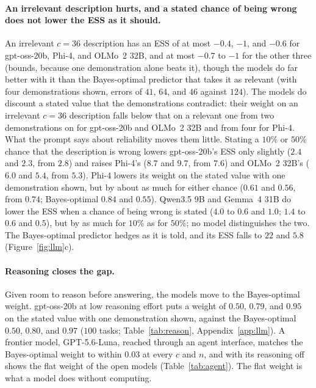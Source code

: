 \documentclass{article}
\begin{document}
\paragraph{An irrelevant description hurts, and a stated chance of being wrong does not lower the ESS as it should.} An irrelevant $c = 36$ description has an ESS of at most $-0.4$, $-1$, and $-0.6$ for gpt-oss-20b, Phi-4, and OLMo~2 32B, and at most $-0.7$ to $-1$ for the other three (bounds, because one demonstration alone beats it), though the models do far better with it than the Bayes-optimal predictor that takes it as relevant (with four demonstrations shown, errors of $41$, $64$, and $46$ against $124$). The models do discount a stated value that the demonstrations contradict: their weight on an irrelevant $c = 36$ description falls below that on a relevant one from two demonstrations on for gpt-oss-20b and OLMo~2 32B and from four for Phi-4. What the prompt says about reliability moves them little. Stating a $10\%$ or $50\%$ chance that the description is wrong lowers gpt-oss-20b's ESS only slightly ($2.4$ and $2.3$, from $2.8$) and raises Phi-4's ($8.7$ and $9.7$, from $7.6$) and OLMo~2 32B's ($6.0$ and $5.4$, from $5.3$). Phi-4 lowers its weight on the stated value with one demonstration shown, but by about as much for either chance ($0.61$ and $0.56$, from $0.74$; Bayes-optimal $0.84$ and $0.55$). Qwen3.5 9B and Gemma~4 31B do lower the ESS when a chance of being wrong is stated ($4.0$ to $0.6$ and $1.0$; $1.4$ to $0.6$ and $0.5$), but by as much for $10\%$ as for $50\%$; no model distinguishes the two. The Bayes-optimal predictor hedges as it is told, and its ESS falls to $22$ and $5.8$ (Figure~\ref{fig:llm}c).

\paragraph{Reasoning closes the gap.} Given room to reason before answering, the models move to the Bayes-optimal weight. gpt-oss-20b at low reasoning effort puts a weight of $0.50$, $0.79$, and $0.95$ on the stated value with one demonstration shown, against the Bayes-optimal $0.50$, $0.80$, and $0.97$ ($100$ tasks; Table~\ref{tab:reason}, Appendix~\ref{app:llm}). A frontier model, GPT-5.6-Luna, reached through an agent interface, matches the Bayes-optimal weight to within $0.03$ at every $c$ and $n$, and with its reasoning off shows the flat weight of the open models (Table~\ref{tab:agent}). The flat weight is what a model does without computing.
\end{document}
